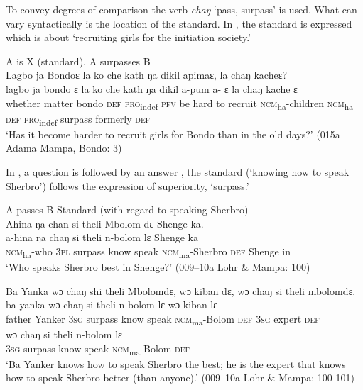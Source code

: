 To convey degrees of comparison the verb \textit{chaŋ} ‘pass, surpass' is used. What can vary syntactically is the location of the standard. In , the standard is expressed which is about ‘recruiting girls for the initiation society.'

\ea%
    \label{ex:230}
    A is X (standard), A surpasses B\\
\vspace{6pt}
    Lagbo ja Bondoɛ la ko che kath ŋa dikil apimaɛ, la chaŋ kacheɛ?\\
    \gll lagbo    ja      bondo    ɛ    la      ko    che  kath  ŋa    dikil    a-pum    a-      ɛ  la      chaŋ    kache      ɛ\\
    whether  matter  bondo  \textsc{def}  \textsc{pro}\textsubscript{indef}  \textsc{pfv}  be    hard to    recruit  \textsc{ncm}\textsubscript{ha}{}-children  \textsc{ncm}\textsubscript{ha}  \textsc{def} \textsc{pro}\textsubscript{indef}  surpass  formerly    \textsc{def}\\
    \glt ‘Has it become harder to recruit girls for Bondo\footnotemark{} than in the old days?' (015a Adama Mampa, Bondo: 3)
    
\z

In , a question  is followed by an answer , the standard (‘knowing how to speak Sherbro') follows the expression of superiority, ‘surpass.'

\ea%
    \label{ex:231}
    A passes B Standard (with regard to speaking Sherbro)\\
    \ea\label{ex:231a} Ahina ŋa chan si theli Mbolom dɛ Shenge  ka.\\
    \gll a-hina      ŋa    chaŋ    si      theli    n-bolom        lɛ    Shenge   ka\\
    \textsc{ncm}\textsubscript{ha}{}-who    \textsc{3pl}  surpass  know    speak    \textsc{ncm}\textsubscript{ma}{}-Sherbro  \textsc{def}  Shenge   in\\
    \glt ‘Who speaks Sherbro best in Shenge?' (009--10a Lohr \& Mampa: 100)

    \ex\label{ex:231b} Ba Yanka wɔ chaŋ shi theli Mbolomdɛ, wɔ kiban dɛ, wɔ chaŋ si theli mbolomdɛ.\\
    \gll ba      yanka    wɔ    chaŋ    si    theli    n-bolom      lɛ    wɔ    kiban    lɛ\\
    father    Yanker  \textsc{3sg}  surpass  know  speak    \textsc{ncm}\textsubscript{ma}{}-Bolom  \textsc{def}  3\textsc{sg}  expert  \textsc{def}\\
    \gll wɔ    chaŋ    si      theli    n-bolom        lɛ\\
    \textsc{3sg}  surpass  know    speak    \textsc{ncm}\textsubscript{ma}{}-Bolom    \textsc{def}\\
    \glt ‘Ba Yanker knows how to speak Sherbro the best; he is the expert that knows how to speak Sherbro better (than anyone).' (009--10a Lohr \& Mampa: 100-101)
\z
\z

